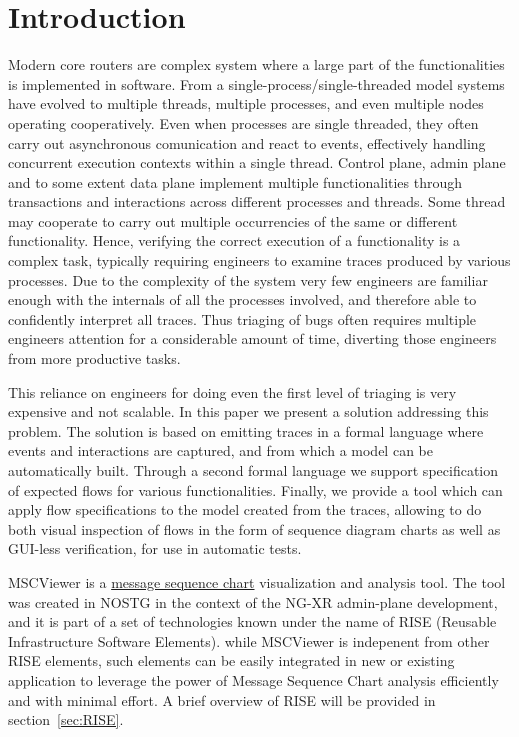 \section{Introduction}



Modern core routers are complex system where a large part of the functionalities
is implemented in software. From a single-process/single-threaded model
systems have evolved to multiple threads, multiple processes, and even multiple 
nodes operating cooperatively. Even when processes are single threaded, they 
often carry out asynchronous comunication and react to events, effectively
handling concurrent execution contexts within a single thread. Control plane,
admin plane and to some extent data plane implement multiple functionalities
through transactions and interactions across different processes and threads.
Some thread may cooperate to carry out multiple occurrencies of the same or
different functionality. Hence, verifying the correct execution of a
functionality is a complex task, typically requiring engineers to examine traces
produced by various processes. Due to the complexity of the system
very few engineers are familiar enough with the internals of all the
processes involved, and therefore able to confidently interpret all traces. Thus
triaging of bugs often requires multiple engineers attention for a considerable
amount of time, diverting those engineers from more productive tasks.
 
This reliance on engineers for doing even the first level of triaging is very
expensive and not scalable. In this paper we present a solution addressing this  
problem. The solution is based on emitting traces in a formal language where 
events and interactions are captured, and from which a model can be
automatically built. Through a second formal language we support specification
of expected flows for various functionalities. Finally, we provide a tool which
can  apply flow specifications to the model created from the traces, allowing
to do both visual inspection of flows in the form of sequence diagram charts as
well as GUI-less verification, for use in automatic tests. 
  

MSCViewer is a
\href{http://en.wikipedia.org/wiki/Message_Sequence_Chart#Live_Sequence_Charts}{message sequence chart}
visualization and analysis tool. The tool was created in NOSTG in the context of
the NG-XR admin-plane development, and it is part of a set of technologies known
under the name of RISE (Reusable Infrastructure Software Elements).
while MSCViewer is indepenent from other RISE elements, such elements can
be easily integrated in new or existing application to 
leverage the power of Message Sequence Chart analysis efficiently and with
minimal effort.
A brief overview of RISE will be provided in section~\ref{sec:RISE}. 
